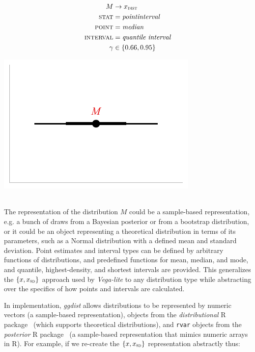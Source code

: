 \documentclass[journal]{vgtc}                     %
\newcommand{\equationfigure}[2]{%
\noindent
\begin{minipage}{.5\columnwidth}
\setlength{\abovedisplayskip}{0pt}
\setlength{\belowdisplayskip}{0pt}
#1\end{minipage}%
\begin{minipage}{.4\columnwidth}\centering #2 \end{minipage}%
\vspace{.5\belowdisplayskip}\\
}
\begin{document}
\equationfigure{
\begin{align*}
M &\rightarrow x_\textsc{dist}\\
\textsc{stat} &= \mathit{pointinterval}\\
\textsc{point} &= \mathit{median}\\
\textsc{interval} &= \textit{quantile interval}\\
\gamma &\in \{0.66, 0.95\}
\end{align*}
}{\includegraphics[width=1.2\columnwidth]{figs/3-stat_pointinterval_A.pdf}}
The representation of the distribution $M$ could be a sample-based representation, e.g. a bunch of draws from a Bayesian posterior or from a bootstrap distribution, or it could be an object representing a theoretical distribution in terms of its parameters, such as a Normal distribution with a defined mean and standard deviation. Point estimates and interval types can be defined by arbitrary functions of distributions, and predefined functions for mean, median, and mode, and quantile, highest-density, and shortest intervals are provided. This generalizes the $\{x, x_\textsc{sd}\}$ approach used by \textit{Vega-lite} to any distribution type while abstracting over the specifics of how points and intervals are calculated.

In implementation, \textit{ggdist} allows distributions to be represented by numeric vectors (a sample-based representation), objects from the \textit{distributional } R package~\cite{oharawild2022distributional} (which supports theoretical distributions), and \texttt{rvar} objects from the \textit{posterior} R package~\cite{burkner2022posterior} (a sample-based representation that mimics numeric arrays in R). For example, if we re-create the $\{x, x_\textsc{sd}\}$ representation abstractly thus:
\end{document}
